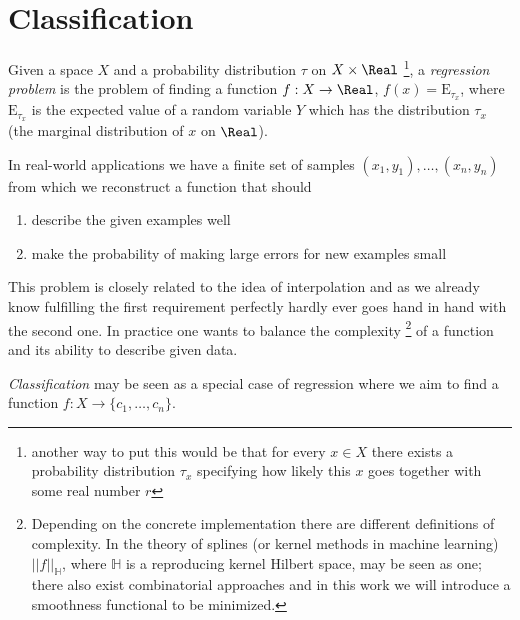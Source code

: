 \section{Classification}
Given a space $X$ and a probability distribution $\tau$ on $X\times \Real$
\footnote{another way to put this would be that for every $x\in X$ there exists a probability distribution $\tau _x$ specifying how likely this $x$ goes together with some real number $r$},
a \textit{regression problem} is the problem of finding a function $f:X\rightarrow\Real$, $f(x)=\mathrm{E}_{\tau _x}$, where  $\mathrm{E}_{\tau _x}$ is the expected value of a random variable $Y$ which has the distribution $\tau _x$ (the marginal distribution of $x$ on $\Real$).

In real-world applications we have a finite set of samples $(x_1,y_1), \dots, (x_n,y_n)$ from which we reconstruct a function that should
\begin{enumerate}
    \item describe the given examples well
    \item make the probability of making large errors for new examples small
\end{enumerate}
This problem is closely related to the idea of interpolation and as we already know fulfilling the first requirement perfectly hardly ever goes hand in hand with the second one. In practice one wants to balance the complexity \footnote{Depending on the concrete implementation there are different definitions of complexity. In the theory of splines (or kernel methods in machine learning) $||f||_\mathbb{H}$, where $\mathbb{H}$ is a reproducing kernel Hilbert space, may be seen as one; there also exist combinatorial approaches and in this work we will introduce a smoothness functional to be minimized.} of a function and its ability to describe given data.

\textit{Classification} may be seen as a special case of regression where we aim to find a function $f:X\rightarrow \{c_1,\dots,c_n\}$.


